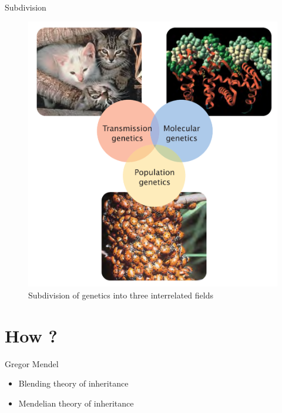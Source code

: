 \documentclass[11pt,ignorenonframetext,aspectratio=169]{beamer}
\providecommand{\tightlist}{%
  \setlength{\itemsep}{0pt}\setlength{\parskip}{0pt}}
\begin{document}
\begin{frame}{Subdivision}
\protect\hypertarget{subdivision}{}
\begin{figure}
\includegraphics[width=0.45\linewidth]{../images/genetics_subdivision} \caption{Subdivision of genetics into three interrelated fields}\label{fig:genetics-subdivision}
\end{figure}
\end{frame}

\hypertarget{how}{%
\section{How ?}\label{how}}

\begin{frame}{Gregor Mendel}
\protect\hypertarget{gregor-mendel}{}
\begin{itemize}
\tightlist
\item
  Blending theory of inheritance
\item
  Mendelian theory of inheritance
\end{itemize}
\end{frame}
\end{document}
